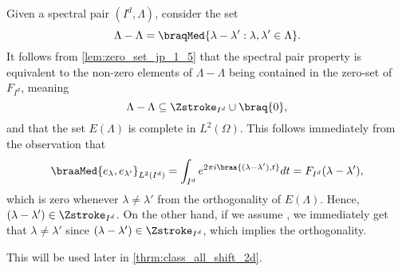 




\begin{remark}\label{rem:zero_set_orthogonal} 
    Given a spectral pair $(I^d,\Lambda)$, consider the set
    \begin{equation}\label{eq:zero_set_orthogonal}
        \Lambda - \Lambda = \braqMed{\lambda-\lambda' : \lambda,\lambda' \in \Lambda}.
    \end{equation}
    It follows from \cref{lem:zero_set_jp_1_5} that the spectral pair property is equivalent to the non-zero elements of $\Lambda - \Lambda$ being contained in the zero-set of $F_{I^d}$, meaning 
    \begin{equation*}  %
        \Lambda - \Lambda \subseteq \Zstroke_{I^d} \cup \braq{0},
    \end{equation*}
    and that the set $E(\Lambda)$ is complete in $L^2(\Omega)$. This follows immediately from the observation that
    \begin{equation*}
        \braaMed{e_{\lambda},e_{\lambda'} }_{L^2(I^d)} = \int_{I^d} e^{2 \pi i \braa{(\lambda-\lambda'),t}} dt = F_{I^d} (\lambda-\lambda'),
    \end{equation*}
    which is zero whenever $\lambda \neq \lambda'$ from the orthogonality of $E(\Lambda)$. Hence, $(\lambda-\lambda') \in \Zstroke_{I^d}$. On the other hand, if we assume , we immediately get that $\lambda \neq \lambda'$ since $(\lambda-\lambda') \in \Zstroke_{I^d}$, which implies the orthogonality.  %
    
\end{remark}
This  will be used later in \cref{thrm:class_all_shift_2d}.
